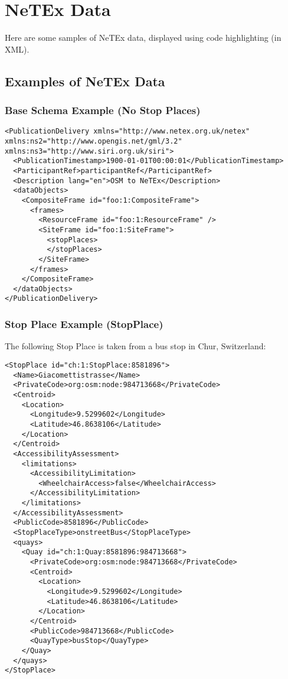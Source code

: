 \chapter{NeTEx Data}
Here are some samples of NeTEx data, displayed using code highlighting (in XML).
\section{Examples of NeTEx Data}
\subsection{Base Schema Example (No Stop Places)}
\begin{verbatim}
<PublicationDelivery xmlns="http://www.netex.org.uk/netex" xmlns:ns2="http://www.opengis.net/gml/3.2" xmlns:ns3="http://www.siri.org.uk/siri">
  <PublicationTimestamp>1900-01-01T00:00:01</PublicationTimestamp>
  <ParticipantRef>participantRef</ParticipantRef>
  <Description lang="en">OSM to NeTEx</Description>
  <dataObjects>
    <CompositeFrame id="foo:1:CompositeFrame">
      <frames>
        <ResourceFrame id="foo:1:ResourceFrame" />
        <SiteFrame id="foo:1:SiteFrame">
          <stopPlaces>
          </stopPlaces>
        </SiteFrame>
      </frames>
    </CompositeFrame>
  </dataObjects>
</PublicationDelivery>
\end{verbatim}
\newpage
\subsection{Stop Place Example (StopPlace)}
The following Stop Place is taken from a bus stop in Chur, Switzerland:
\begin{verbatim}
<StopPlace id="ch:1:StopPlace:8581896">
  <Name>Giacomettistrasse</Name>
  <PrivateCode>org:osm:node:984713668</PrivateCode>
  <Centroid>
    <Location>
      <Longitude>9.5299602</Longitude>
      <Latitude>46.8638106</Latitude>
    </Location>
  </Centroid>
  <AccessibilityAssessment>
    <limitations>
      <AccessibilityLimitation>
        <WheelchairAccess>false</WheelchairAccess>
      </AccessibilityLimitation>
    </limitations>
  </AccessibilityAssessment>
  <PublicCode>8581896</PublicCode>
  <StopPlaceType>onstreetBus</StopPlaceType>
  <quays>
    <Quay id="ch:1:Quay:8581896:984713668">
      <PrivateCode>org:osm:node:984713668</PrivateCode>
      <Centroid>
        <Location>
          <Longitude>9.5299602</Longitude>
          <Latitude>46.8638106</Latitude>
        </Location>
      </Centroid>
      <PublicCode>984713668</PublicCode>
      <QuayType>busStop</QuayType>
    </Quay>
  </quays>
</StopPlace>
\end{verbatim}
\newpage
